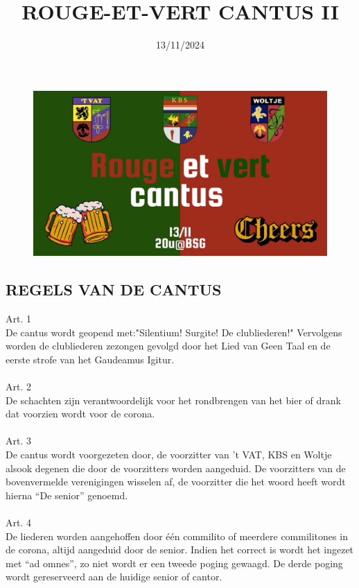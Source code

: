\documentclass[a4paper, 14pt]{extarticle}
\title{\textbf{ROUGE-ET-VERT CANTUS II}}
\author{}
\date{\Large 13/11/2024}
\begin{document}
\maketitle
\begin{figure}[h]
    \centering
    \includegraphics[width=\textwidth]{images/banner.jpg}
\end{figure}
\thispagestyle{empty}
\newpage
\begin{center}
  \section*{REGELS VAN DE CANTUS}
\end{center}
Art. 1\\
De cantus wordt geopend met:"Silentium! Surgite! De clubliederen!" Vervolgens worden de clubliederen zezongen gevolgd door het Lied van Geen Taal en de eerste strofe van het Gaudeamus Igitur.\\\\
Art. 2\\
De schachten zijn verantwoordelijk voor het rondbrengen van het bier of drank dat voorzien wordt voor de corona.\\\\
Art. 3\\
De cantus wordt voorgezeten door, de voorzitter van 't VAT, KBS en Woltje alsook degenen die door de voorzitters worden aangeduid. De voorzitters van de bovenvermelde verenigingen wisselen af, de voorzitter die het woord heeft wordt hierna ``De senior'' genoemd.\\\\
Art. 4\\
    De liederen worden aangehoffen door één commilito of meerdere commilitones in de corona, altijd aangeduid door de senior. Indien het correct is wordt het ingezet met ``ad omnes'', zo niet wordt er een tweede poging gewaagd. De derde poging wordt gereserveerd aan de huidige senior of cantor.\\\\
\end{document}
